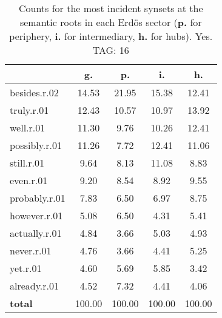 \begin{table}[h!]
\begin{center}
\begin{tabular}{| l | c | c | c | c |}\hline
 & g. & p. & i. & h. \\\hline
besides.r.02 & 14.53  & 21.95  & 15.38  & 12.41 \\\hline
truly.r.01 & 12.43  & 10.57  & 10.97  & 13.92 \\\hline
well.r.01 & 11.30  & 9.76  & 10.26  & 12.41 \\\hline
possibly.r.01 & 11.26  & 7.72  & 12.41  & 11.06 \\\hline
still.r.01 & 9.64  & 8.13  & 11.08  & 8.83 \\\hline
even.r.01 & 9.20  & 8.54  & 8.92  & 9.55 \\\hline
probably.r.01 & 7.83  & 6.50  & 6.97  & 8.75 \\\hline
however.r.01 & 5.08  & 6.50  & 4.31  & 5.41 \\\hline
actually.r.01 & 4.84  & 3.66  & 5.03  & 4.93 \\\hline
never.r.01 & 4.76  & 3.66  & 4.41  & 5.25 \\\hline
yet.r.01 & 4.60  & 5.69  & 5.85  & 3.42 \\\hline
already.r.01 & 4.52  & 7.32  & 4.41  & 4.06 \\\hline
{{\bf total}} & 100.00  & 100.00  & 100.00  & 100.00 \\\hline
\end{tabular}
\caption{Counts for the most incident synsets at the semantic roots in each Erd\"os sector ({\bf p.} for periphery, {\bf i.} for intermediary, {\bf h.} for hubs). Yes. TAG: 16}
\end{center}
\end{table}